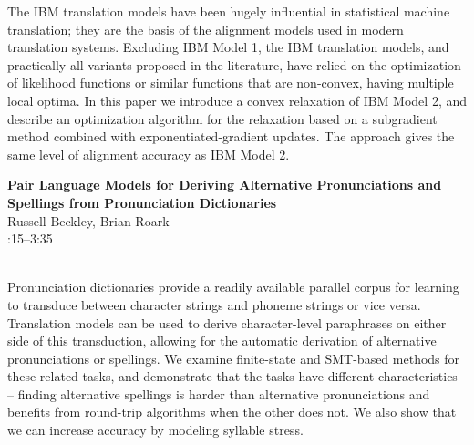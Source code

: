 \documentclass[twoside,makeidx]{book}
\renewcommand{\normalsize}{\fontsize{8}{9}\selectfont}
\renewcommand{\small}{\fontsize{7}{8}\selectfont}
\begin{document}
\nopagebreak%
\noindent%
{\small The IBM translation models have been hugely influential in statistical machine translation; they are the basis of the alignment models used in modern translation systems.  Excluding IBM Model 1, the IBM translation models, and practically all variants proposed in the literature, have relied on the optimization of likelihood functions or similar functions that are non-convex, having multiple local optima. In this paper we introduce a convex relaxation of IBM Model 2, and describe an optimization algorithm for the relaxation based on a subgradient method combined with exponentiated-gradient updates. The approach gives the same level of alignment accuracy as IBM Model 2.}
\par\vspace{2em}\noindent%
\begin{minipage}{\linewidth}%
\begin{center}
\textbf{\normalsize Pair Language Models for Deriving Alternative Pronunciations and Spellings from Pronunciation Dictionaries}\\
\normalsize  Russell Beckley,  Brian Roark\\
{\small 3:15--3:35}\\
\end{center}
\end{minipage}\\[0.5em]
\nopagebreak%
\noindent%
{\small Pronunciation dictionaries provide a readily available parallel corpus for   learning to transduce between character strings and phoneme strings   or vice versa.  Translation models can be used to derive   character-level paraphrases on either side of this transduction, allowing for   the automatic derivation of alternative pronunciations or spellings.   We examine finite-state and SMT-based methods for these related   tasks, and demonstrate that the tasks have different characteristics   -- finding alternative spellings is harder than alternative   pronunciations and benefits from round-trip algorithms when the   other does not.  We also show that we can increase accuracy by modeling syllable stress.}
\clearpage
\end{document}
